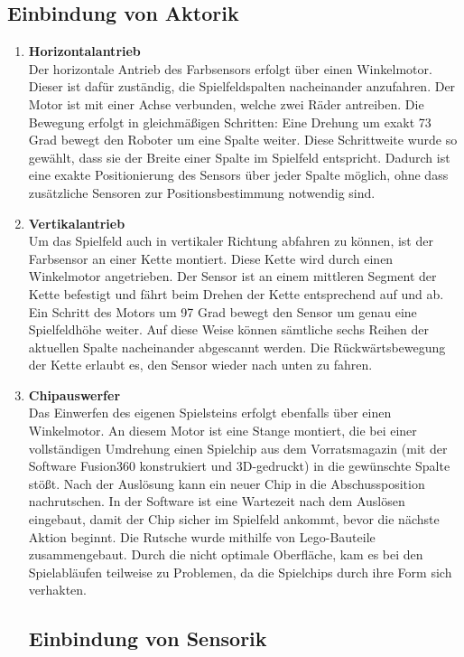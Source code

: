 \subsection{Einbindung von Aktorik}
\begin{enumerate}
	\item \textbf{Horizontalantrieb}\\
	Der horizontale Antrieb des Farbsensors erfolgt über einen Winkelmotor. Dieser ist dafür zuständig, die Spielfeldspalten nacheinander anzufahren. Der Motor ist mit einer Achse verbunden, welche zwei Räder antreiben. Die Bewegung erfolgt in gleichmäßigen Schritten: Eine Drehung um exakt 73 Grad bewegt den Roboter um eine Spalte weiter. Diese Schrittweite wurde so gewählt, dass sie der Breite einer Spalte im Spielfeld entspricht. Dadurch ist eine exakte Positionierung des Sensors über jeder Spalte möglich, ohne dass zusätzliche Sensoren zur Positionsbestimmung notwendig sind. 
	\item \textbf{Vertikalantrieb}\\
	 Um das Spielfeld auch in vertikaler Richtung abfahren zu können, ist der Farbsensor an einer Kette montiert. Diese Kette wird durch einen Winkelmotor angetrieben. Der Sensor ist an einem mittleren Segment der Kette befestigt und fährt beim Drehen der Kette entsprechend auf und ab. Ein Schritt des Motors um 97 Grad bewegt den Sensor um genau eine Spielfeldhöhe weiter. Auf diese Weise können sämtliche sechs Reihen der aktuellen Spalte nacheinander abgescannt werden. Die Rückwärtsbewegung der Kette erlaubt es, den Sensor wieder nach unten zu fahren.
	\item \textbf{Chipauswerfer}\\
	Das Einwerfen des eigenen Spielsteins erfolgt ebenfalls über einen Winkelmotor. An diesem Motor ist eine Stange montiert, die bei einer vollständigen Umdrehung einen Spielchip aus dem Vorratsmagazin (mit der Software Fusion360 konstrukiert und 3D-gedruckt) in die gewünschte Spalte stößt. Nach der Auslösung kann ein neuer Chip in die Abschussposition nachrutschen. In der Software ist eine Wartezeit nach dem Auslösen eingebaut, damit der Chip sicher im Spielfeld ankommt, bevor die nächste Aktion beginnt. Die Rutsche wurde mithilfe von Lego-Bauteile zusammengebaut. Durch die nicht optimale Oberfläche, kam es bei den Spielabläufen teilweise zu Problemen, da die Spielchips durch ihre Form sich verhakten.


\subsection{Einbindung von Sensorik}


\end{enumerate}
